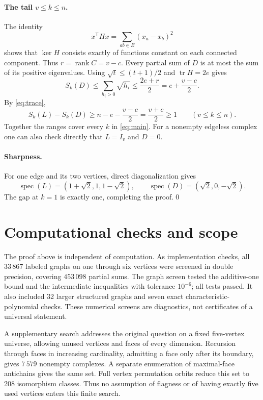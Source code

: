 \documentclass[11pt]{article}
\newcommand{\tr}{\operatorname{tr}}
\newcommand{\rank}{\operatorname{rank}}
\newcommand{\spec}{\operatorname{spec}}
\newcommand{\T}{\mathsf{T}}
\begin{document}
\paragraph{The tail $v\leq k\leq n$.}
The identity
\[
 x^{\T}Hx=\sum_{ab\in E}(x_a-x_b)^2
\]
shows that $\ker H$ consists exactly of functions constant on each
connected component. Thus $r=\rank C=v-c$. Every partial sum of $D$ is
at most the sum of its positive eigenvalues. Using
$\sqrt t\leq(t+1)/2$ and $\tr H=2e$ gives
\[
 S_k(D)\leq\sum_{h_i>0}\sqrt{h_i}
 \leq\frac{2e+r}{2}=e+\frac{v-c}{2}.
\]
By \eqref{eq:trace},
\[
 S_k(L)-S_k(D)\geq n-e-\frac{v-c}{2}
                  =\frac{v+c}{2}\geq1\qquad(v\leq k\leq n).
\]
Together the ranges cover every $k$ in \eqref{eq:main}. For a nonempty
edgeless complex one can also check directly that $L=I_v$ and $D=0$.

\paragraph{Sharpness.}
For one edge and its two vertices, direct diagonalization gives
\[
 \spec(L)=(1+\sqrt2,1,1-\sqrt2),\qquad
 \spec(D)=(\sqrt2,0,-\sqrt2).
\]
The gap at $k=1$ is exactly one, completing the proof.\qed

\section{Computational checks and scope}

The proof above is independent of computation. As implementation checks,
all $33\,867$ labeled graphs on one through six vertices were screened in
double precision, covering $453\,098$ partial sums. The graph screen tested
the additive-one bound and the intermediate inequalities with tolerance
$10^{-6}$; all tests passed. It also included 32 larger structured graphs
and seven exact characteristic-polynomial checks. These numerical screens
are diagnostics, not certificates of a universal statement.

A supplementary search addresses the original question on a fixed
five-vertex universe, allowing unused vertices and faces of every dimension.
Recursion through faces in increasing cardinality, admitting a face only
after its boundary, gives $7\,579$ nonempty complexes. A separate
enumeration of maximal-face antichains gives the same set. Full vertex
permutation orbits reduce this set to 208 isomorphism classes. Thus no
assumption of flagness or of having exactly five used vertices enters
this finite search.
\end{document}
